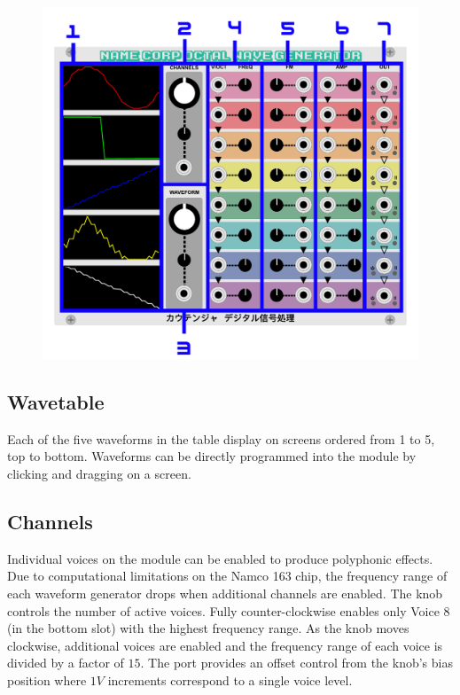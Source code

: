 \documentclass[12pt,letter]{article}
\begin{document}
\begin{figure}[!htp]
\centering
\includegraphics[width=\maxwidth{\textwidth}]{img/Interface}
\end{figure}

\subsection{Wavetable}

Each of the five waveforms in the table display on screens ordered from 1 to 5, top to bottom. Waveforms can be directly programmed into the module by clicking and dragging on a screen.

\subsection{Channels}

Individual voices on the module can be enabled to produce polyphonic effects. Due to computational limitations on the Namco 163 chip, the frequency range of each waveform generator drops when additional channels are enabled. The knob controls the number of active voices. Fully counter-clockwise enables only Voice 8 (in the bottom slot) with the highest frequency range. As the knob moves clockwise, additional voices are enabled and the frequency range of each voice is divided by a factor of $15$. The port provides an offset control from the knob's bias position where $1V$ increments correspond to a single voice level.
\end{document}
